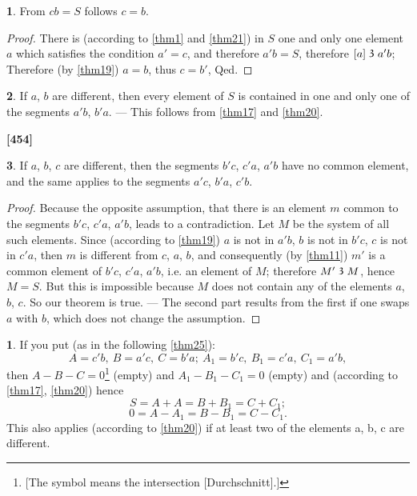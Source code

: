 \documentclass[leqno,hidelinks,a4paper]{article}
\theoremstyle{definition}
\newtheorem{satz}{\protect\satzname}
\newtheorem*{zusatz}{\protect\zusatzname}
\newcommand{\satzname}{}
\newcommand{\zusatzname}{}
\renewcommand{\satzname}{\hspace{-4pt}.\ Satz}%
\renewcommand{\zusatzname}{Zusatz}%
\renewcommand{\satzname}{\hspace{-4pt}.\ Theorem}%
\renewcommand{\zusatzname}{Corollary}%
\newcommand\partof{\mathrel{\raisebox{0.45ex}{$\mathfrak{3}$}}}
\begin{document}
\begin{satz}\label{thm22}
From $cb=S$ follows $c = b$.
\end{satz}

\begin{proof}
There is (according to \ref{thm1} and \ref{thm21}) in $S$ one and only one element $a$ which satisfies the condition $a'=c$, and therefore $a'b = S$, therefore $[a] \partof a'b$; Therefore (by \ref{thm19}) $a=b$, thus $c=b'$, Qed.
\end{proof}

\begin{satz}\label{thm23}
If $a$, $b$ are different, then every element of $S$ is contained in one and only one of the segments $a'b$, $b'a$. --- This follows from \ref{thm17} and \ref{thm20}.
\end{satz}

\noindent \textbf{[454]}

\begin{satz}\label{thm24}
If $a$, $b$, $c$ are different, then the segments $b'c$, $c'a$, $a'b$ have no common element, and the same applies to the segments $a'c$, $b'a$, $c'b$.
\end{satz}
\begin{proof}
Because the opposite assumption, that there is an element $m$ common to the segments $b'c$, $c'a$, $a'b$, leads to a contradiction.
Let $M$ be the system of all such elements.
Since (according to \ref{thm19}) $a$ is not in $a'b$, $b$ is not in $b'c$, $c$ is not in $c'a$, then $m$ is different from $c$, $a$, $b$, and consequently (by \ref{thm11}) $m'$ is a common element of $b'c$, $c'a$, $a'b$, i.e. an element of $M$; therefore $M' \partof M$, hence  $M=S$.
But this is impossible because $M$ does not contain any of the elements $a$, $b$, $c$. So our theorem is true.
--- The second part results from the first if one swaps $a$ with $b$, which does not change the assumption.\end{proof}

\begin{zusatz}
If you put (as in the following \ref{thm25}):
\[
    A=c'b,\ B=a'c,\ C = b'a;\ A_1 = b'c,\ B_1 = c'a,\ C_1 = a'b,
\]
then $A-B-C=0$\footnote{[The symbol means the intersection [Durchschnitt].]} (empty) and $A_1- B_1 - C_1=0$ (empty) and (according to \ref{thm17}, \ref{thm20}) hence
\[
S = A + A = B + B_1 = C +C_1;
\]
\[
0=A-A_1=B-B_1=C-C_1.
\]
This also applies (according to \ref{thm20}) if at least two of the elements a, b, c are different.\end{zusatz}
\end{document}
